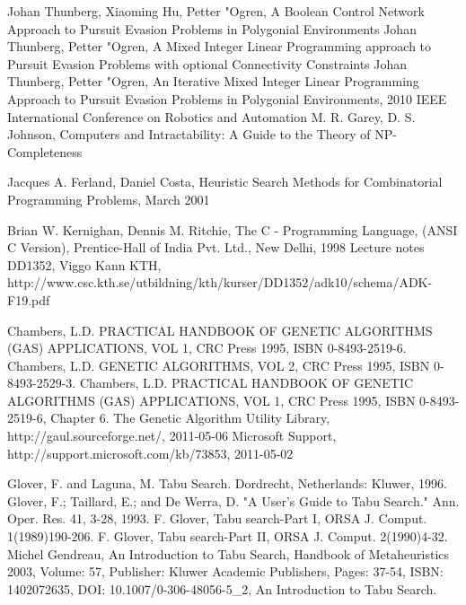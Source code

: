 \begin{thebibliography}{99}
  Johan Thunberg, Xiaoming Hu, Petter "Ogren, A Boolean Control Network Approach to Pursuit Evasion Problems in Polygonial Environments
 Johan Thunberg, Petter "Ogren, A Mixed Integer Linear Programming approach to Pursuit Evasion Problems with optional Connectivity Constraints
 Johan Thunberg, Petter "Ogren, An Iterative Mixed Integer Linear Programming Approach to Pursuit Evasion Problems in Polygonial Environments, 2010 IEEE International Conference on Robotics and Automation
 M. R. Garey, D. S. Johnson, Computers and Intractability: A Guide to the Theory of NP-Completeness

Jacques A. Ferland, Daniel Costa, Heuristic Search Methods for Combinatorial Programming Problems, March 2001

 Brian W. Kernighan, Dennis M. Ritchie, The C - Programming Language, (ANSI C Version), Prentice-Hall of India Pvt. Ltd., New Delhi, 1998
Lecture notes DD1352, Viggo Kann KTH,  http://www.csc.kth.se/utbildning/kth/kurser/DD1352/adk10/schema/ADK-F19.pdf

 Chambers, L.D. PRACTICAL HANDBOOK OF GENETIC ALGORITHMS (GAS) APPLICATIONS, VOL 1, CRC Press 1995, ISBN 0-8493-2519-6.
 Chambers, L.D. GENETIC ALGORITHMS, VOL 2, CRC Press 1995, ISBN 0-8493-2529-3.
 Chambers, L.D. PRACTICAL HANDBOOK OF GENETIC ALGORITHMS (GAS) APPLICATIONS, VOL 1, CRC Press 1995, ISBN 0-8493-2519-6, Chapter 6.
 The Genetic Algorithm Utility Library, http://gaul.sourceforge.net/, 2011-05-06
 Microsoft Support, http://support.microsoft.com/kb/73853, 2011-05-02

  Glover, F. and Laguna, M. Tabu Search. Dordrecht, Netherlands: Kluwer, 1996.
  Glover, F.; Taillard, E.; and De Werra, D. "A User's Guide to Tabu Search." Ann. Oper. Res. 41, 3-28, 1993.
 F. Glover, Tabu search-Part I, ORSA J. Comput. 1(1989)190-206.
 F. Glover, Tabu search-Part II, ORSA J. Comput. 2(1990)4-32.
 Michel Gendreau, An Introduction to Tabu Search, Handbook of Metaheuristics 2003, Volume: 57, Publisher: Kluwer Academic Publishers, Pages: 37-54, ISBN: 1402072635, DOI: 10.1007/0-306-48056-5\_2, An Introduction to Tabu Search.


\end{thebibliography}
